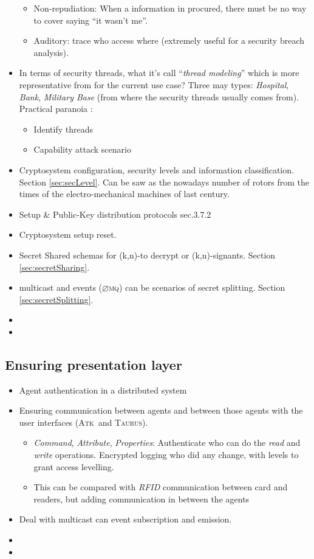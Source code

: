 \documentclass[10pt,a4paper,twoside]{llncs}
\newcommand{\taurus}{\textsc{Taurus}}
\newcommand{\atk}{\textsc{Atk}}
\newcommand{\zmq}{\textsc{$\varnothing$mq}}
\begin{document}
\begin{itemize}
\begin{itemize}
  \item Non-repudiation: When a information in procured, there must be no way to cover saying ``it wasn't me''.
  \item Auditory: trace who access where (extremely useful for a security breach analysis).
 \end{itemize}
 \item In terms of security threads, what it's call ``\emph{thread modeling}'' which is more representative from \cite{SecEngRossAnderson} for the current use case? Three may types: \emph{Hospital}, \emph{Bank}, \emph{Military Base} (from where the security threads usually comes from). Practical paranoia \cite{PractCryptoSchneier}:
 \begin{itemize}
  \item Identify threads
  \item Capability attack scenario
 \end{itemize}
 \item Cryptosystem configuration, security levels and information classification. Section \ref{sec:secLevel}. Can be saw as the nowadays number of rotors from the times of the electro-mechanical machines of last century.
 \item Setup \& Public-Key distribution protocols \cite{SecEngRossAnderson} sec.3.7.2
 \item Cryptosystem setup reset.
 \item Secret Shared schemas for (k,n)-to decrypt or (k,n)-signants. Section \ref{sec:secretSharing}.
 \item multicast and events (\zmq) can be scenarios of secret splitting. Section \ref{sec:secretSplitting}.
 \item 
 \item 
\end{itemize}

%
\subsection{Ensuring presentation layer \label{sec:presentationLayer}}

\begin{itemize}
 \item Agent authentication in a distributed system
 \item Ensuring communication between agents and between those agents with the user interfaces (\atk\, and \taurus).
 \begin{itemize}
  \item \emph{Command}, \emph{Attribute}, \emph{Properties}: Authenticate who can do the \emph{read} and \emph{write} operations. Encrypted logging who did any change, with levels to grant access levelling.
  \item This can be compared with \emph{RFID} communication between card and readers, but adding communication in between the agents
 \end{itemize}
 \item Deal with multicast can event subscription and emission.
 \item 
 \item 
\end{itemize}
\end{document}

